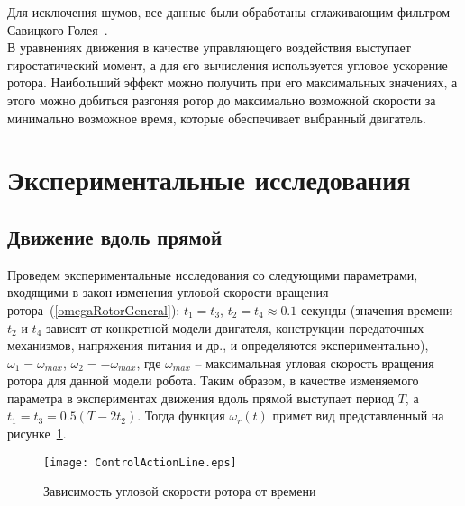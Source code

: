Для исключения шумов, все данные были обработаны сглаживающим фильтром Савицкого-Голея~\cite{SGolay}.\\

В уравнениях движения в качестве управляющего воздействия выступает гиростатический момент, а для его вычисления используется угловое ускорение ротора. Наибольший эффект можно получить при его максимальных значениях, а этого можно добиться разгоняя ротор до максимально возможной скорости за минимально возможное время, которые обеспечивает выбранный двигатель.

\section{Экспериментальные исследования}

\subsection{Движение вдоль прямой}

Проведем экспериментальные исследования со следующими параметрами, входящими в закон изменения угловой скорости вращения ротора~(\ref{omegaRotorGeneral}): $t_1=t_3$, $ t_2 = t_4 \approx 0.1 $ секунды (значения времени $ t_2$ и $ t_4 $ зависят от конкретной модели двигателя, конструкции передаточных механизмов, напряжения питания и др., и определяются экспериментально), $ \omega_1 = \omega_{max} $, $ \omega_2 = -\omega_{max} $, где $ \omega_{max} $ -- максимальная угловая скорость вращения ротора для данной модели робота. Таким образом, в качестве изменяемого параметра в экспериментах движения вдоль прямой выступает период $ T $, а $t_1=t_3 = 0.5(T - 2t_2)$. Тогда функция $ \omega_r(t) $ примет вид представленный на рисунке~\ref{ControlActionLine}.


\begin{figure}[!ht]
	\centering
	\texttt{[image: ControlActionLine.eps]}
	\caption{Зависимость угловой скорости ротора от времени}
	\label{ControlActionLine}
\end{figure}

%	
%	
%	
%	
%	

